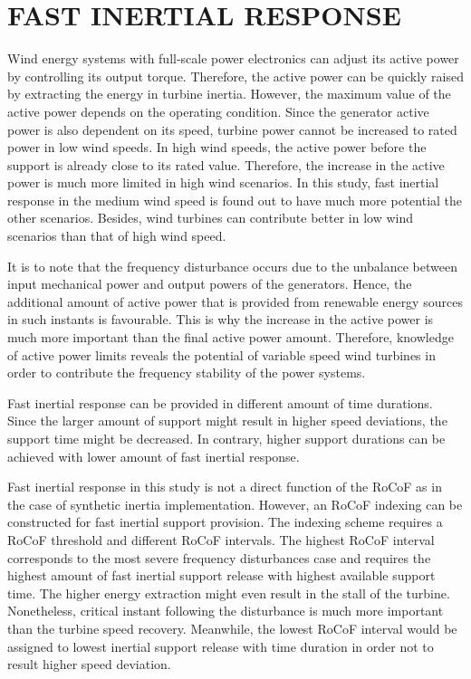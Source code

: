 \section{FAST INERTIAL RESPONSE}
Wind energy systems with full-scale power electronics can adjust its active power by controlling its output torque. Therefore, the active power can be quickly raised by extracting the energy in turbine inertia. However, the maximum value of the active power depends on the operating condition. Since the generator active power is also dependent on its speed, turbine power cannot be increased to rated power in low wind speeds. In high wind speeds, the active power before the support is already close to its rated value. Therefore, the increase in the active power is much more limited in high wind scenarios. In this study, fast inertial response in the medium wind speed is found out to have much more potential the other scenarios. Besides, wind turbines can contribute better in low wind scenarios than that of high wind speed.\par
It is to note that the frequency disturbance occurs due to the unbalance between input mechanical power and output powers of the generators. Hence, the additional amount of active power that is provided from renewable energy sources in such instants is favourable. This is why the increase in the active power is much more important than the final active power amount. Therefore, knowledge of active power limits reveals the potential of variable speed wind turbines in order to contribute the frequency stability of the power systems.\par
Fast inertial response can be provided in different amount of time durations. Since the larger amount of support might result in higher speed deviations, the support time might be decreased. In contrary, higher support durations can be achieved with lower amount of fast inertial response.\par
Fast inertial response in this study is not a direct function of the RoCoF as in the case of synthetic inertia implementation. However, an RoCoF indexing can be constructed for fast inertial support provision. The indexing scheme requires a RoCoF threshold and different RoCoF intervals. The highest RoCoF interval corresponds to the most severe frequency disturbances case and requires the highest amount of fast inertial support release with highest available support time. The higher energy extraction might even result in the stall of the turbine. Nonetheless, critical instant following the disturbance is much more important than the turbine speed recovery. Meanwhile, the lowest RoCoF interval would be assigned to lowest inertial support release with time duration in order not to result higher speed deviation. 
